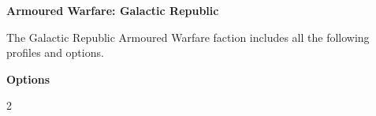 \documentclass{article}
\begin{document}
{\Huge \textbf{Armoured Warfare: Galactic Republic}}
\vspace{0.6cm}

\begin{minipage}{19cm}
    The Galactic Republic Armoured Warfare faction includes all the following profiles and options.
\end{minipage}

\vspace{0.3cm}
{\scriptsize

\setlength\extrarowheight{1.5pt}


}
\vspace{0.6cm}

{\Large \textbf{Options}}
\begin{multicols}{2}

{\scriptsize

\setlength\extrarowheight{1.5pt}


}
\end{multicols}
\end{document}
